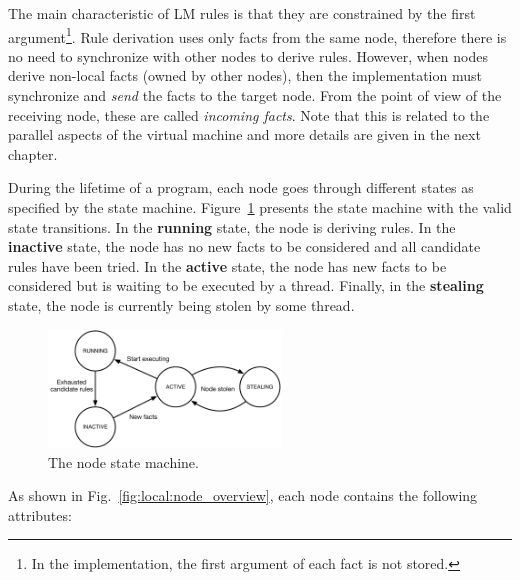 The main characteristic of LM rules is that they are constrained by the first
argument\footnote{In the implementation, the first argument of each fact is not
stored.}. Rule derivation uses only facts from the same node, therefore there is
no need to synchronize with other nodes to derive rules. However, when nodes
derive non-local facts (owned by other nodes), then the implementation must
synchronize and \emph{send} the facts to the target node. From the point of view
of the receiving node, these are called \emph{incoming facts}. Note that this is related
to the parallel aspects of the virtual machine and more details are given in the
next chapter.

During the lifetime of a program, each node goes through different states as
specified by the state machine. Figure~\ref{fig:local:node_states} presents the
state machine with the valid state transitions.  In the \textbf{running} state,
the node is deriving rules. In the \textbf{inactive} state, the node has no new
facts to be considered and all candidate rules have been tried. In the
\textbf{active} state, the node has new facts to be considered but is waiting to
be executed by a thread. Finally, in the \textbf{stealing} state, the node is
currently being stolen by some thread.

\begin{figure}[ht]
   \centering
   \includegraphics[width=0.55\textwidth]{figures/local/node_state.pdf}
   \caption{The node state machine.}
   \label{fig:local:node_states}
\end{figure}

As shown in Fig.~\ref{fig:local:node_overview}, each node contains the
following attributes:

